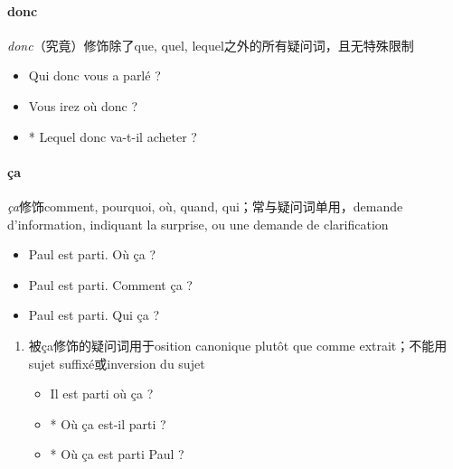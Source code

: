 \documentclass[UTF8]{report}
\begin{document}
\paragraph{donc}
\textit{donc}（究竟）修饰除了que, quel, lequel之外的所有疑问词，且无特殊限制
\begin{itemize}
    \item Qui donc vous a parlé ?
    \item Vous irez où donc ?
    \item * Lequel donc va-t-il acheter ?
\end{itemize}
\paragraph{ça}
\textit{ça}修饰comment, pourquoi, où, quand, qui；常与疑问词单用，demande d’information, indiquant la surprise, ou une demande de clarification
\begin{itemize}
    \item Paul est parti. Où ça ?
    \item Paul est parti. Comment ça ?
    \item Paul est parti. Qui ça ?
\end{itemize}
\begin{enumerate}
    \item 被ça修饰的疑问词用于osition canonique plutôt que comme extrait；不能用sujet suffixé或inversion du sujet
    \begin{itemize}
        \item Il est parti où ça ?
        \item * Où ça est-il parti ?
        \item * Où ça est parti Paul ?
    \end{itemize}
\end{enumerate}
\end{document}
